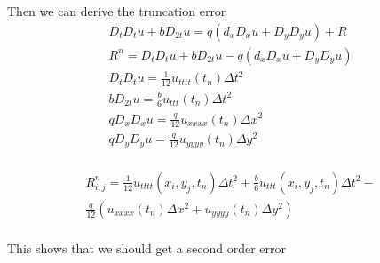 \documentclass[norsk,11pt,a4paper]{article}
\begin{document}
Then we can derive the truncation error
\begin{equation}
\begin{aligned}
D_tD_tu + bD_{2t}u = q(d_xD_xu+D_yD_yu) +R \\
R^n = D_tD_tu + bD_{2t}u - q(d_xD_xu+D_yD_yu) \\
D_tD_tu = \frac{1}{12}u_{tttt}(t_n)\Delta t^2\\
bD_{2t}u = \frac{b}{6}u_{ttt}(t_n)\Delta t^2\\
qD_xD_xu = \frac{q}{12}u_{xxxx}(t_n)\Delta x^2\\
qD_yD_yu = \frac{q}{12}u_{yyyy}(t_n)\Delta y^2\\
\end{aligned}
\end{equation}

\begin{equation}
\begin{aligned}
R^n_{i,j}=\frac{1}{12}u_{tttt}(x_i,y_j,t_n)\Delta t^2+\frac{b}{6}u_{ttt}(x_i,y_j,t_n)\Delta t^2-\\
\frac{q}{12}\left(u_{xxxx}(t_n)\Delta x^2+u_{yyyy}(t_n)\Delta y^2\right)\\
\end{aligned}
\end{equation}

This shows that we should get a second order error
\end{document}
